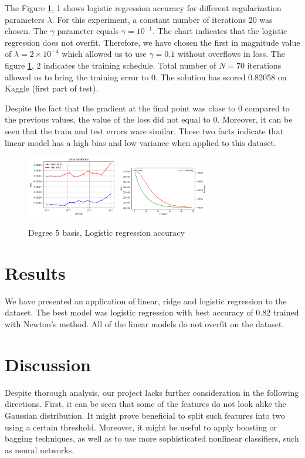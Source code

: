 \documentclass[10pt,conference,compsocconf]{IEEEtran}
\begin{document}
The Figure \ref{fig:logreg}, 1 shows logistic regression accuracy for different regularization parameters $\lambda$. For this experiment, a constant number of iterations $20$ was chosen. The $\gamma$ parameter equals $\gamma=10^{-1}$. The chart indicates that the logistic regression does not overfit. Therefore, we have chosen the first in magnitude value of $\lambda=2\times 10^{-4}$ which allowed us to use $\gamma=0.1$ without overflows in loss. The figure \ref{fig:logreg}, 2 indicates the training schedule. Total number of $N=70$ iterations allowed us to bring the training error to 0. The solution has scored 0.82058 on Kaggle \cite{kaggle} (first part of test).

Despite the fact that the gradient at the final point was close to $0$ compared to the previous values, the value of the loss did not equal to 0. Moreover, it can be seen that the train and test errors ware similar. These two facts indicate that linear model has a high bias and low variance when applied to this dataset.

\begin{figure}[!htb]
	\centering \includegraphics[width=150px]{logistic_lambda_cv_netwon_nobatch}
	\centering \includegraphics[width=150px]{logistic_01}
	
	\caption{Degree 5 basis, Logistic regression accuracy}
	\label{fig:logreg}
\end{figure}

\section{Results}
We have presented an application of linear, ridge and logistic regression to the dataset. The best model was logistic regression with best accuracy of 0.82 trained with Newton's method. All of the linear models do not overfit on the dataset.
\section{Discussion}
Despite thorough analysis, our project lacks further consideration in the following directions. First, it can be seen that some of the features do not look alike the Gaussian distribution. It might prove beneficial to split such features into two using a certain threshold. Moreover, it might be useful to apply boosting or bagging techniques, as well as to use more sophisticated nonlinear classifiers, such as neural networks.
\end{document}
